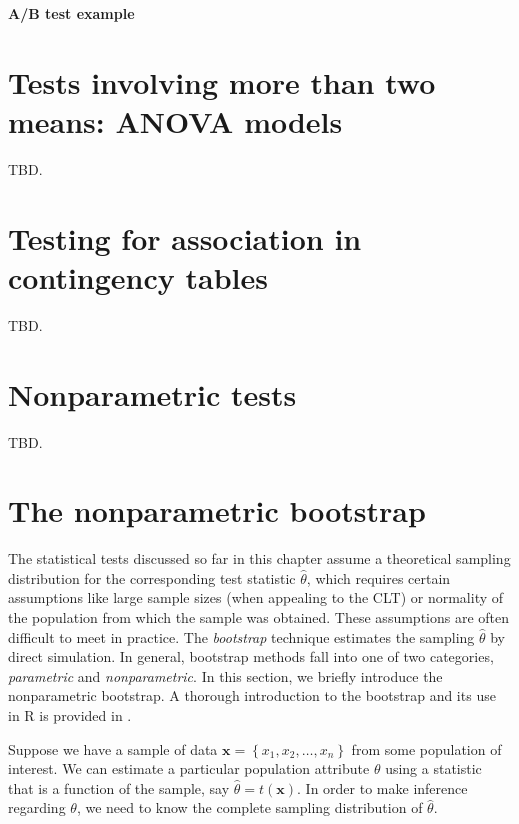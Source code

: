 \documentclass[]{book}
\theoremstyle{definition}
\theoremstyle{definition}
\theoremstyle{definition}
\theoremstyle{remark}
\begin{document}
\textbf{A/B test example}

\hypertarget{tests-involving-more-than-two-means-anova-models}{%
\section{Tests involving more than two means: ANOVA
models}\label{tests-involving-more-than-two-means-anova-models}}

TBD.

\hypertarget{testing-for-association-in-contingency-tables}{%
\section{Testing for association in contingency
tables}\label{testing-for-association-in-contingency-tables}}

TBD.

\hypertarget{nonparametric-tests}{%
\section{Nonparametric tests}\label{nonparametric-tests}}

TBD.

\hypertarget{bootstrap}{%
\section{The nonparametric bootstrap}\label{bootstrap}}

The statistical tests discussed so far in this chapter assume a
theoretical sampling distribution for the corresponding test statistic
\(\widehat{\theta}\), which requires certain assumptions like large
sample sizes (when appealing to the CLT) or normality of the population
from which the sample was obtained. These assumptions are often
difficult to meet in practice. The \emph{bootstrap} technique
\citep{efron-bootstrap-1979} estimates the sampling \(\widehat{\theta}\)
by direct simulation. In general, bootstrap methods fall into one of two
categories, \emph{parametric} and \emph{nonparametric}. In this section,
we briefly introduce the nonparametric bootstrap. A thorough
introduction to the bootstrap and its use in R is provided in
\citet{davison-bootstrap-1997}.

Suppose we have a sample of data
\(\boldsymbol{x} = \left\{x_1, x_2, \dots, x_n\right\}\) from some
population of interest. We can estimate a particular population
attribute \(\theta\) using a statistic that is a function of the sample,
say \(\widehat{\theta} = t\left(\boldsymbol{x}\right)\). In order to
make inference regarding \(\theta\), we need to know the complete
sampling distribution of \(\widehat{\theta}\).
\end{document}
